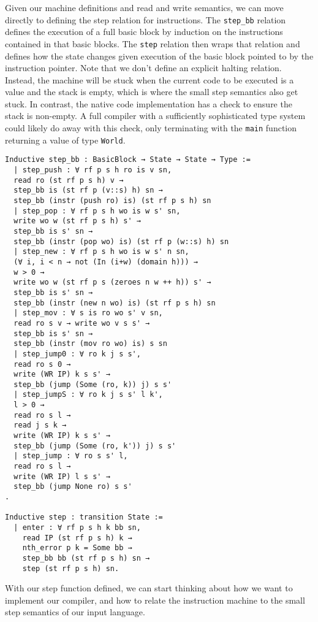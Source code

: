 Given our machine definitions and read and write semantics, we can move directly
to defining the step relation for instructions. The \texttt{step\_bb} relation
defines the execution of a full basic block by induction on the instructions
contained in that basic blocks. The \texttt{step} relation then wraps that
relation and defines how the state changes given execution of the basic block
pointed to by the instruction pointer. Note that we don't define an explicit
halting relation. Instead, the machine will be stuck when the current code to be
executed is a value and the stack is empty, which is where the small step
\ce semantics also get stuck. In contrast, the native code implementation has a
check to ensure the stack is non-empty. A full compiler with a sufficiently
sophisticated type system could likely do away with this check, only terminating
with the \texttt{main} function returning a value of type \texttt{World}. 

\begin{verbatim}
Inductive step_bb : BasicBlock → State → State → Type := 
  | step_push : ∀ rf p s h ro is v sn,
  read ro (st rf p s h) v → 
  step_bb is (st rf p (v::s) h) sn → 
  step_bb (instr (push ro) is) (st rf p s h) sn
  | step_pop : ∀ rf p s h wo is w s' sn,
  write wo w (st rf p s h) s' → 
  step_bb is s' sn →
  step_bb (instr (pop wo) is) (st rf p (w::s) h) sn
  | step_new : ∀ rf p s h wo is w s' n sn,
  (∀ i, i < n → not (In (i+w) (domain h))) →
  w > 0 →
  write wo w (st rf p s (zeroes n w ++ h)) s' →
  step_bb is s' sn → 
  step_bb (instr (new n wo) is) (st rf p s h) sn 
  | step_mov : ∀ s is ro wo s' v sn, 
  read ro s v → write wo v s s' → 
  step_bb is s' sn → 
  step_bb (instr (mov ro wo) is) s sn
  | step_jump0 : ∀ ro k j s s', 
  read ro s 0 →
  write (WR IP) k s s' → 
  step_bb (jump (Some (ro, k)) j) s s'
  | step_jumpS : ∀ ro k j s s' l k', 
  l > 0 →
  read ro s l →
  read j s k → 
  write (WR IP) k s s' → 
  step_bb (jump (Some (ro, k')) j) s s'
  | step_jump : ∀ ro s s' l, 
  read ro s l →
  write (WR IP) l s s' → 
  step_bb (jump None ro) s s'
.

Inductive step : transition State :=
  | enter : ∀ rf p s h k bb sn,
    read IP (st rf p s h) k → 
    nth_error p k = Some bb → 
    step_bb bb (st rf p s h) sn →
    step (st rf p s h) sn.
\end{verbatim}

With our step function defined, we can start thinking about how we want to
implement our compiler, and how to relate the instruction machine to the small
step semantics of our input language.  

